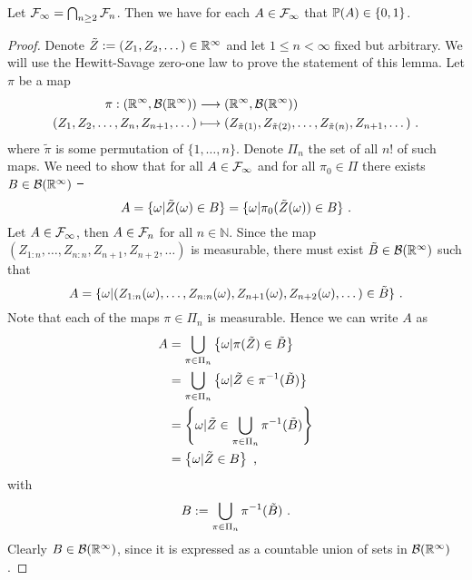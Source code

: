 \begin{lemma} \label{lem:hewitt_savage}
	Let $\F_\infty = \bigcap_{n\geq 2} \F_n$. Then we have for each $A\in \F_\infty$ that $\P(A)\in \{0,1\}$.
	\begin{proof}
		Denote $\tilde{Z}:=(Z_1, Z_2,\dots)\in\R^\infty$ and let $1\leq n<\infty$ fixed but arbitrary. We will use the Hewitt-Savage zero-one law to prove the statement of this lemma. Let $\pi$  be a map
		\begin{align*}
		\pi: (\R^\infty, \mathcal{B}(\R^\infty)) &\longrightarrow (\R^\infty, \mathcal{B}(\R^\infty))\\
		(Z_1, Z_2,\dots,Z_n, Z_{n+1}, \dots) &\longmapsto (Z_{\tilde\pi(1)}, Z_{\tilde\pi(2)},\dots,Z_{\tilde\pi(n)}, Z_{n+1}, \dots)\mdot
		\end{align*}
		where $\tilde{\pi}$ is some permutation of $\{1,\dots,n\}$. Denote $\Pi_n$ the set of all $n!$ of such maps. 
		We need to show that for all $A\in\F_\infty$ and for all $\pi_0\in\Pi$ there exists $B\in\mathcal{B}(\R^\infty)$ \st\ 
		\begin{equation}
		A = \{\omega| \tilde{Z}(\omega) \in B\} = \{\omega| \pi_0(\tilde{Z}(\omega)) \in B\} \mdot
		\label{eq:hewitt_savage}
		\end{equation} 	
		Let $A\in\F_\infty$, then $A\in\F_n$ for all $n\in\mathbb{N}$. Since the map $(Z_{1:n}, \dots, Z_{n:n}, Z_{n+1}, Z_{n+2}, \dots)$ is measurable, there must exist $\tilde{B}\in\mathcal{B}(\R^\infty)$ such that
		\begin{equation*}
		A = \{\omega | (Z_{1:n}(\omega), \dots, Z_{n:n}(\omega), Z_{n+1}(\omega), Z_{n+2}(\omega), \dots) \in \tilde{B}\}\mdot 
		\label{eq:A_Z_inv}
		\end{equation*}
		Note that each of the maps $\pi\in\Pi_n$ is measurable. Hence we can write $A$ as
		\begin{align*}
		A &= \bigcup\limits_{\pi\in\Pi_n}\left \{\omega | \pi(\tilde{Z}) \in \tilde{B}\right\}\\
		&=  \bigcup\limits_{\pi\in\Pi_n} \left\{\omega | \tilde{Z} \in \pi^{-1}(\tilde{B})\right\}\\
		&=  \left\{\omega | \tilde{Z} \in \bigcup\limits_{\pi\in\Pi_n}\pi^{-1}(\tilde{B})\right\}\\
		&= \left\{\omega | \tilde{Z} \in B\right\}\mcomma
		\end{align*}		
		with 
		$$B:=\bigcup\limits_{\pi\in\Pi_n}\pi^{-1}(\tilde{B})\mdot$$
		Clearly $B\in\mathcal{B}(\R^\infty)$, since it is expressed as a countable union of sets in $\mathcal{B}(\R^\infty)$.

\end{proof}
\end{lemma}
